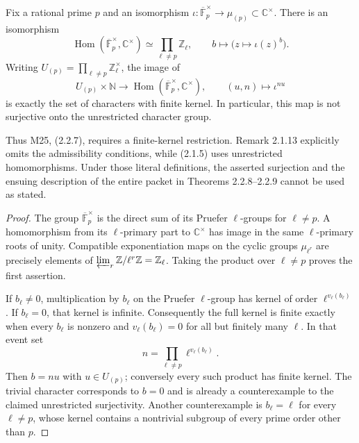 \begin{proposition}
\label{AC-T15}
Fix a rational prime \(p\) and an isomorphism
\(\iota:\overline{\mathbb F}_p^\times\longrightarrow\mu_{(p)}
\subset\mathbb C^\times\).  There is an isomorphism
\[
 \operatorname{Hom}(\overline{\mathbb F}_p^\times,\mathbb C^\times)
   \simeq \prod_{\ell\ne p}\mathbb Z_\ell,\qquad
 b\longmapsto\bigl(z\longmapsto\iota(z)^b\bigr).
\]
Writing \(U_{(p)}=\prod_{\ell\ne p}\mathbb Z_\ell^\times\), the image of
\[
 U_{(p)}\times\mathbb N\longrightarrow
 \operatorname{Hom}(\overline{\mathbb F}_p^\times,\mathbb C^\times),
 \qquad (u,n)\longmapsto\iota^{nu}
\]
is exactly the set of characters with finite kernel.  In particular,
this map is not surjective onto the unrestricted character group.

Thus M25, (2.2.7), requires a finite-kernel restriction.
Remark 2.1.13 explicitly omits the admissibility conditions, while
(2.1.5) uses unrestricted homomorphisms.  Under those literal
definitions, the asserted surjection and the ensuing description of
the entire packet in Theorems 2.2.8--2.2.9 cannot be used as stated.
\end{proposition}
\begin{proof}
The group \(\overline{\mathbb F}_p^\times\) is the direct sum of its
Pruefer \(\ell\)-groups for \(\ell\ne p\).  A homomorphism from its
\(\ell\)-primary part to \(\mathbb C^\times\) has image in the same
\(\ell\)-primary roots of unity.  Compatible exponentiation maps on
the cyclic groups \(\mu_{\ell^r}\) are precisely elements of
\(\varprojlim_r\mathbb Z/\ell^r\mathbb Z=\mathbb Z_\ell\).
Taking the product over \(\ell\ne p\) proves the first assertion.

If \(b_\ell\ne0\), multiplication by \(b_\ell\) on the Pruefer
\(\ell\)-group has kernel of order \(\ell^{v_\ell(b_\ell)}\).
If \(b_\ell=0\), that kernel is infinite.  Consequently the full
kernel is finite exactly when every \(b_\ell\) is nonzero and
\(v_\ell(b_\ell)=0\) for all but finitely many \(\ell\).
In that event set
\[
 n=\prod_{\ell\ne p}\ell^{v_\ell(b_\ell)}.
\]
Then \(b=nu\) with \(u\in U_{(p)}\); conversely every such product
has finite kernel.  The trivial character corresponds to \(b=0\)
and is already a counterexample to the claimed unrestricted
surjectivity.  Another counterexample is \(b_\ell=\ell\) for every
\(\ell\ne p\), whose kernel contains a nontrivial subgroup of every
prime order other than \(p\).
\end{proof}

